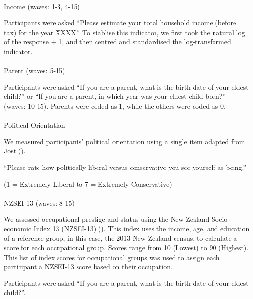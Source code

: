 \documentclass[
  singlecolumn]{article}
\makeatletter
\let\oldparagraph\paragraph
\renewcommand{\paragraph}{
    \@ifstar
      \xxxParagraphStar
      \xxxParagraphNoStar
  }
\newcommand{\xxxParagraphStar}[1]{\oldparagraph*{#1}\mbox{}}
\newcommand{\xxxParagraphNoStar}[1]{\oldparagraph{#1}\mbox{}}
\makeatother
\begin{document}
\paragraph{Income (waves: 1-3, 4-15)}\label{income-waves-1-3-4-15}

Participants were asked ``Please estimate your total household income
(before tax) for the year XXXX''. To stablise this indicator, we first
took the natural log of the response + 1, and then centred and
standardised the log-transformed indicator.

\paragraph{Parent (waves: 5-15)}\label{parent-waves-5-15}

Participants were asked ``If you are a parent, what is the birth date of
your eldest child?'' or ``If you are a parent, in which year was your
eldest child born?'' (waves: 10-15). Parents were coded as 1, while the
others were coded as 0.

\paragraph{Political Orientation}\label{political-orientation}

We measured participants' political orientation using a single item
adapted from Jost ().

``Please rate how politically liberal versus conservative you see
yourself as being.''

(1 = Extremely Liberal to 7 = Extremely Conservative)

\paragraph{NZSEI-13 (waves: 8-15)}\label{nzsei-13-waves-8-15}

We assessed occupational prestige and status using the New Zealand
Socio-economic Index 13 (NZSEI-13) (). This index uses the income, age, and education of
a reference group, in this case, the 2013 New Zealand census, to
calculate a score for each occupational group. Scores range from 10
(Lowest) to 90 (Highest). This list of index scores for occupational
groups was used to assign each participant a NZSEI-13 score based on
their occupation.

Participants were asked ``If you are a parent, what is the birth date of
your eldest child?''.
\end{document}
